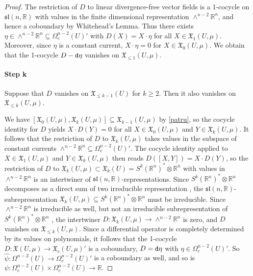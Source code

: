 \documentclass{article}
\newcommand{\fX}{\mathfrak{X}}
\newcommand{\R}{\mathbb{R}}
\newcommand{\dd}{{\tt d}}
\theoremstyle{definition}
\begin{document}
\begin{proof}
The restriction of $D$ to  linear divergence-free vector fields is a 1-cocycle on 
$\mathfrak{sl}(n,\R)$ with values in the finite dimensional representation $\wedge^{n-2}\R^n$, and hence a coboundary by Whitehead's Lemma.
Thus there exists $\eta \in \wedge^{n-2}\R^n \subseteq \Omega^{n-2}_{c}(U)'$ with  $D(X) = X \cdot \eta$ for all $X\in\fX_{1}(U, \mu)$. 
Moreover, since $\eta$ is a constant current, $X\cdot \eta = 0$ for $X \in \fX_{0}(U, \mu)$.
We obtain that the 1-cocycle $D-\dd \eta$ vanishes on $\fX_{\leq 1}(U, \mu)$.


\paragraph{Step k} Suppose that $D$ vanishes on $\fX_{\leq k-1}(U)$ for $k\ge 2$.
Then it also vanishes on  $\fX_{\leq k}(U, \mu)$.

We have $[\fX_{ 0}(U, \mu),\fX_{ k}(U, \mu)]\subseteq \fX_{ k-1}(U, \mu)$ by \eqref{patru},
so the cocycle identity for $D$ yields 
$X\cdot D(Y) = 0$ for all $X\in \fX_{0}(U,\mu)$ and $Y \in \fX_{k}(U,\mu)$. It follows that the restriction of $D$ to $\fX_{k}(U,\mu)$
takes values in the subspace of constant currents $\wedge^{n-2}\R^{n} \subseteq \Omega^{n-2}_{c}(U)'$.
The cocycle identity applied to $X \in \fX_{1}(U, \mu)$ and $Y \in \fX_{k}(U, \mu)$
then reads $D([X,Y]) = X \cdot D(Y)$, 
so the restriction of $D$ to 
$\fX_{k}(U, \mu) \subset \fX_{k}(U)=S^{k}(\R^{n})^*\otimes \R^n$ with values in $\wedge^{n-2}\R^{n} $ is an intertwiner of 
$\mathfrak{sl}(n,\R)$-representations.
Since $S^{k}(\R^{n})^*\otimes \R^n$ decomposes as a direct sum of two irreducible representation 
\cite[Prop~15.25]{FultonHarris04}, 
the $\mathfrak{sl}(n,\R)$-subrepresentation $\fX_{k}(U,\mu) \subseteq S^{k}(\R^{n})^*\otimes \R^n$ must be irreducible.
Since $\wedge^{n-2}\R^n$ is irreducible as well,
but not an irreducible subrepresentation of $S^{k}(\R^{n})^*\otimes \R^n$ \cite[Prop~15.25]{FultonHarris04},
the intertwiner  $D \colon \fX_{k}(U,\mu) \rightarrow \wedge^{n-2}\R^{n}$ is zero, and $D$ vanishes on $\fX_{\leq k}(U, \mu)$. Since a differential operator is completely determined by its values on polynomials, it follows that the 1-cocycle $D \colon \fX(U,\mu) \rightarrow \fX_{c}(U,\mu)'$ is a coboundary, $D=\dd\eta$ with $\eta \in  \Omega^{n-2}_{c}(U)'$. So $\widehat{\psi} \colon \Omega^{n-2}(U) \rightarrow \Omega^{n-2}_{c}(U)'$ is a coboundary as well, 
and so is $\psi \colon \Omega_{c}^{n-2}(U) \times \Omega_{c}^{n-2}(U) \rightarrow \R$.
\end{proof}
\end{document}

